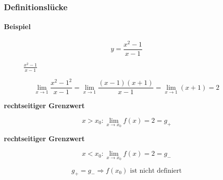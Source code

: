\subsubsection{Definitionslücke}

\paragraph{Beispiel}

\[
    y = \frac{x^2 - 1}{x - 1}
\]

\begin{figure}[H]
    \centering
    \caption{\(\frac{x^2 - 1}{x - 1}\)}
\end{figure}

\[
    \lim_{x \rightarrow 1} \frac{x^2 - 1^2}{x - 1}
    = \lim_{x \rightarrow 1} \frac{(x - 1)(x + 1)}{x - 1}
    = \lim_{x \rightarrow 1} (x+1)
    = 2    
\]

\textbf{rechtseitiger Grenzwert}

\[
    x > x_0: \lim_{x \rightarrow x_0} f(x) = 2 = g_{+}
\]

\textbf{rechtseitiger Grenzwert}

\[
    x < x_0: \lim_{x \rightarrow x_0} f(x) = 2 = g_{-}
\]


\[
    g_{+} = g_{-} \Rightarrow \text{\(f(x_0)\) ist nicht definiert}
\]
